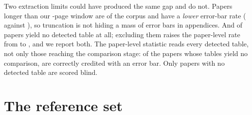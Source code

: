 \documentclass{article}
\begin{document}
Two extraction limits could have produced the same gap and do not. Papers longer
than our \nMaxPages{}-page window are \nPctLongPapers{} of the corpus and have a
\emph{lower} error-bar rate (\nErrorBarLong{} against \nErrorBarShort{}), so
truncation is not hiding a mass of error bars in appendices. And \nPctNoTable{}
of papers yield no detected table at all; excluding them raises the paper-level
rate from \nPctWithErrorBar{} to \nPctWithErrorBarConditional{}, and we report
both. The paper-level statistic reads every detected table, not only those
reaching the comparison stage: of the \nPapersTablesNoComparison{} papers whose
tables yield no comparison, \nPapersTablesNoComparisonWithBar{} are correctly
credited with an error bar. Only papers with no detected table are scored blind.

\section{The reference set}
\label{app:gold}
\end{document}
